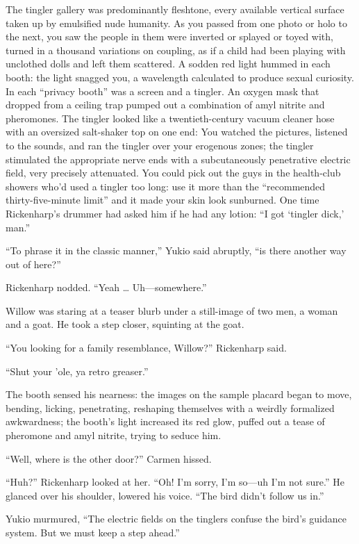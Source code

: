 The tingler gallery was predominantly fleshtone, every available vertical surface taken up by emulsified nude humanity. As you passed from one photo or holo to the next, you saw the people in them were inverted or splayed or toyed with, turned in a thousand variations on coupling, as if a child had been playing with unclothed dolls and left them scattered. A sodden red light hummed in each booth: the light snagged you, a wavelength calculated to produce sexual curiosity. In each “privacy booth” was a screen and a tingler. An oxygen mask that dropped from a ceiling trap pumped out a combination of amyl nitrite and pheromones. The tingler looked like a twentieth-century vacuum cleaner hose with an oversized salt-shaker top on one end: You watched the pictures, listened to the sounds, and ran the tingler over your erogenous zones; the tingler stimulated the appropriate nerve ends with a subcutaneously penetrative electric field, very precisely attenuated. You could pick out the guys in the health-club showers who’d used a tingler too long: use it more than the “recommended thirty-five-minute limit” and it made your skin look sunburned. One time Rickenharp’s drummer had asked him if he had any lotion: “I got ‘tingler dick,’ man.”

“To phrase it in the classic manner,” Yukio said abruptly, “is there another way out of here?”

Rickenharp nodded. “Yeah … Uh—somewhere.”

Willow was staring at a teaser blurb under a still-image of two men, a woman and a goat. He took a step closer, squinting at the goat.

“You looking for a family resemblance, Willow?” Rickenharp said.

“Shut your ’ole, ya retro greaser.”

The booth sensed his nearness: the images on the sample placard began to move, bending, licking, penetrating, reshaping themselves with a weirdly formalized awkwardness; the booth’s light increased its red glow, puffed out a tease of pheromone and amyl nitrite, trying to seduce him.

“Well, where is the other door?” Carmen hissed.

“Huh?” Rickenharp looked at her. “Oh! I’m sorry, I’m so—uh I’m not sure.” He glanced over his shoulder, lowered his voice. “The bird didn’t follow us in.”

Yukio murmured, “The electric fields on the tinglers confuse the bird’s guidance system. But we must keep a step ahead.”

